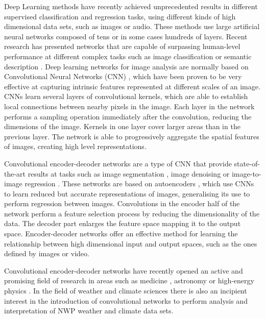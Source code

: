 Deep Learning \citep{lecun2015deep} methods have recently achieved unprecedented results in different supervised classification and regression tasks, using different kinds of high dimensional data sets, such as images or audio. These methods use large artificial neural networks composed of tens or in some cases hundreds of layers. Recent research has presented networks that are capable of surpassing human-level performance at different complex tasks such as image classification \citep{krizhevsky2012imagenet} or semantic description \citep{karpathy2015deep}. Deep learning networks for image analysis are normally based on Convolutional Neural Networks (CNN) \citep{krizhevsky2012imagenet}, which have been proven to be very effective at capturing intrinsic features represented at different scales of an image. CNNs learn several layers of convolutional kernels, which are able to establish local connections between nearby pixels in the image. Each layer in the network performs a sampling operation immediately after the convolution, reducing the dimensions of the image. Kernels in one layer cover larger areas than in the previous layer. The network is able to progressively aggregate the spatial features of images, creating high level representations.

\medskip

Convolutional encoder-decoder networks are a type of CNN that provide state-of-the-art results at tasks such as image segmentation \citep{badrinarayanan2017segnet}, image denoising \citep{mao2016image} or image-to-image regression \citep{isola2017image}. These networks are based on autoencoders \citep{hinton2006reducing}, which use CNNs to learn reduced but accurate representations of images, generalising its use to perform regression between images. Convolutions in the encoder half of the network perform a feature selection process by reducing the dimensionality of the data. The decoder part enlarges the feature space mapping it to the output space. Encoder-decoder networks offer an effective method for learning the relationship between high dimensional input and output spaces, such as the ones defined by images or video.

\medskip

Convolutional encoder-decoder networks have recently opened an active and promising field of research in areas such as medicine \citep{greenspan2016guest}, astronomy \citep{shallue2018identifying} or high-energy physics \citep{baldi2014searching}. In the field of weather and climate sciences there is also an incipient interest in the introduction of convolutional networks to perform analysis and interpretation of NWP weather and climate data sets.

